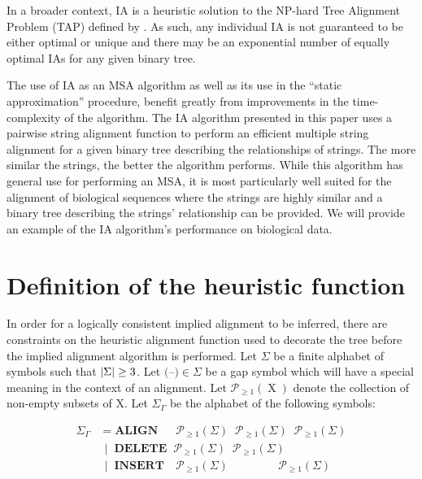 \documentclass[11pt]{article}
\newcommand*\NEPowerset{\mathcal{P}_{\geq 1}}
\newcommand*\gap{\textrm{(--)}}
\DeclarePairedDelimiter\setsize{\lvert}{\rvert}%
\begin{document}
In a broader context, IA is a heuristic solution to the NP-hard Tree Alignment Problem (TAP) defined by \cite{sankoff1975}.
As such, any individual IA is not guaranteed to be either optimal or unique and there may be an exponential number of equally optimal IAs for any given binary tree.

The use of IA as an MSA algorithm as well as its use in the ``static approximation'' procedure, benefit greatly from improvements in the time-complexity of the algorithm.
The IA algorithm presented in this paper uses a pairwise string alignment function to perform an efficient multiple string alignment for a given binary tree describing the relationships of strings.
The more similar the strings, the better the algorithm performs.
While this algorithm has general use for performing an MSA, it is most particularly well suited for the alignment of biological sequences where the strings are highly similar and a binary tree describing the strings' relationship can be provided. 
We will provide an example of the IA algorithm's performance on biological data.


\section{Definition of the heuristic function}
In order for a logically consistent implied alignment to be inferred, there are constraints on the heuristic alignment function used to decorate the tree before the implied alignment algorithm is performed.
Let $\Sigma$ be a finite alphabet of symbols such that $\setsize{\Sigma} \geq 3$.
Let $\gap \in \Sigma$ be a gap symbol which will have a special meaning in the context of an alignment.
Let $\NEPowerset (\operatorname{X})$ denote the collection of non-empty subsets of $\mathrm{X}$.
Let $\Sigma_{\Gamma}$ be the alphabet of the following symbols:

\begin{align*}
  \Sigma_{\Gamma} &      = \textbf{ALIGN}  \;\;\;\;\;\,  \NEPowerset (\Sigma) \;\; \NEPowerset (\Sigma) \;\; \NEPowerset (\Sigma)
\\                & \;\, | \;\; \textbf{DELETE} \;\;     \NEPowerset (\Sigma) \;\; \NEPowerset (\Sigma)
\\                & \;\, | \;\; \textbf{INSERT} \;\;\;\, \NEPowerset (\Sigma) \;\; \quad\quad\quad\;         \;\; \NEPowerset (\Sigma)
\end{align*}
\end{document}
